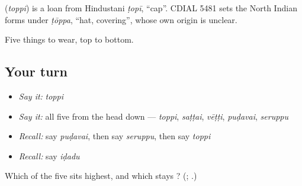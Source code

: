 \begin{cousinweb}
\textbf{} (\emph{toppi}) is a loan from Hindustani \emph{ṭopī}, \textquotedblleft{}cap\textquotedblright{}. CDIAL 5481 sets the North Indian forms under \emph{ṭōppa}, \textquotedblleft{}hat, covering\textquotedblright{}, whose own origin is unclear.
\end{cousinweb}

\begin{grammarlens}[title={What you've built}]
Five things to wear, top to bottom.
\end{grammarlens}

\subsection*{Your turn}
\begin{itemize}
\raggedright
  \item \emph{Say it:} \emph{toppi}
  \item \emph{Say it:} all five from the head down — \emph{toppi}, \emph{saṭṭai}, \emph{vēṭṭi}, \emph{puḍavai}, \emph{seruppu}
  \item \emph{Recall:} say \emph{puḍavai}, then say \emph{seruppu}, then say \emph{toppi}
  \item \emph{Recall:} say \emph{iḍadu}
\end{itemize}

\begin{tcolorbox}[breakable,colback=teal!4,colframe=teal!35!black,title={Before you move on}]
Which of the five sits highest, and which stays ? (\textbf{}; \textbf{}.)
\end{tcolorbox}
